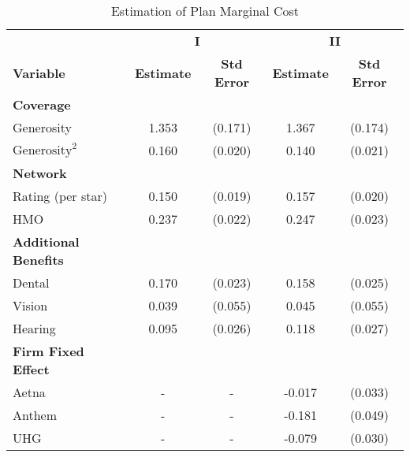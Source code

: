 \begin{table}[ht]\scriptsize
    \centering
    \begin{threeparttable}
        \caption{Estimation of Plan Marginal Cost}
        \begin{tabular}{lcccc}
        \toprule
        & \multicolumn{2}{c}{\textbf{I}} & \multicolumn{2}{c}{\textbf{II}} \\
        \multirow{1}{*}{\textbf{Variable}} & \textbf{Estimate} & \textbf{Std Error} & \textbf{Estimate} & \textbf{Std Error} \\
        \midrule
        \textbf{Coverage} & & & & \\
        Generosity & 1.353 & (0.171) & 1.367 & (0.174) \\
        $\text{Generosity}^2$ & 0.160 & (0.020) & 0.140 & (0.021) \\
        \midrule
        \textbf{Network} & & & & \\
        Rating (per star) & 0.150 & (0.019) & 0.157 & (0.020) \\
        HMO & 0.237 & (0.022) & 0.247 & (0.023) \\
        \midrule
        \textbf{Additional Benefits} & & & & \\
        Dental  & 0.170 & (0.023) & 0.158 & (0.025) \\
        Vision  & 0.039 & (0.055) & 0.045 & (0.055) \\
        Hearing  & 0.095 & (0.026) & 0.118 & (0.027) \\
        \midrule
        \textbf{Firm Fixed Effect} & & & & \\
        Aetna & - & - & -0.017 & (0.033) \\
        Anthem & - & - & -0.181 & (0.049) \\
        UHG & - & - & -0.079 & (0.030) \\
        \bottomrule
        \end{tabular}
    \end{threeparttable}
\end{table}